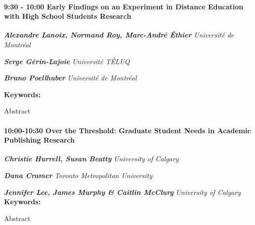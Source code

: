 \documentclass[
]{book}
\begin{document}
\begin{session}
\hypertarget{early-findings-on-an-experiment-in-distance-education-with-high-school-students-research}{%
\paragraph*{\texorpdfstring{9:30 - 10:00 \textbar{} \textbf{Early
Findings on an Experiment in Distance Education with High School
Students} \textbar{}
Research}{9:30 - 10:00 \textbar{} Early Findings on an Experiment in Distance Education with High School Students \textbar{} Research}}\label{early-findings-on-an-experiment-in-distance-education-with-high-school-students-research}}

\textbf{\emph{Alexandre Lanoix, Normand Roy, Marc-André Éthier}}
\textbar{} \emph{Université de Montréal}

\textbf{\emph{Serge Gérin-Lajoie}} \textbar{} \emph{Université TÉLUQ}

\textbf{\emph{Bruno Poellhuber}} \textbar{} \emph{Université de
Montréal}

\textbf{Keywords:}

Abstract
\end{session}

\begin{session}
\hypertarget{over-the-threshold-graduate-student-needs-in-academic-publishing-research}{%
\paragraph*{\texorpdfstring{10:00-10:30 \textbar{} \textbf{Over the
Threshold: Graduate Student Needs in Academic Publishing} \textbar{}
Research}{10:00-10:30 \textbar{} Over the Threshold: Graduate Student Needs in Academic Publishing \textbar{} Research}}\label{over-the-threshold-graduate-student-needs-in-academic-publishing-research}}

\textbf{\emph{Christie Hurrell, Susan Beatty}} \textbar{}
\emph{University of Calgary}

\textbf{\emph{Dana Cramer}} \textbar{} \emph{Toronto Metropolitan
University}

\textbf{\emph{Jennifer Lee, James Murphy \& Caitlin McClurg}} \textbar{}
\emph{University of Calgary} \textbf{Keywords:}

Abstract
\end{session}
\end{document}
